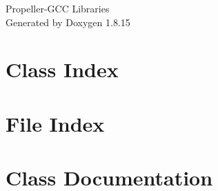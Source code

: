 \let\mypdfximage\pdfximage\def\pdfximage{\immediate\mypdfximage}\documentclass[twoside]{book}
\newcommand{\+}{\discretionary{\mbox{\scriptsize$\hookleftarrow$}}{}{}}
\newcommand{\clearemptydoublepage}{%
  \newpage{\pagestyle{empty}\cleardoublepage}%
}
\begin{document}
\hypersetup{pageanchor=false,
             bookmarksnumbered=true,
             pdfencoding=unicode
            }
\begin{titlepage}
\vspace*{7cm}
\begin{center}%
{\Large Propeller-\/\+G\+CC Libraries }\\
\vspace*{1cm}
{\large Generated by Doxygen 1.8.15}\\
\end{center}
\end{titlepage}
\clearemptydoublepage
{}
\tableofcontents
\clearemptydoublepage
{}
\hypersetup{pageanchor=true}

\chapter{Class Index}

\chapter{File Index}

\chapter{Class Documentation}


































\end{document}
